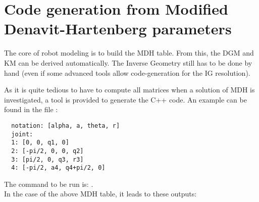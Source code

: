 \documentclass{ecnreport}
\begin{document}
  
  \newpage
  \section{Code generation from Modified Denavit-Hartenberg parameters}\label{dhcode}

  The core of robot modeling is to build the MDH table. From this, the DGM and KM can be derived automatically. The Inverse Geometry still has to be done by hand (even if some advanced tools allow code-generation for the IG resolution).

  As it is quite tedious to have to compute all matrices when a solution of MDH is investigated, a tool is provided to generate the C++ code. An example can be found in the file :
  \cppstyle
  \begin{lstlisting}
  notation: [alpha, a, theta, r]
  joint:
  1: [0, 0, q1, 0]
  2: [-pi/2, 0, 0, q2]
  3: [pi/2, 0, q3, r3]
  4: [-pi/2, a4, q4+pi/2, 0]
  \end{lstlisting}
  The command to be run is: .\\
  In the case of the above MDH table, it leads to these outputs:
\end{document}

